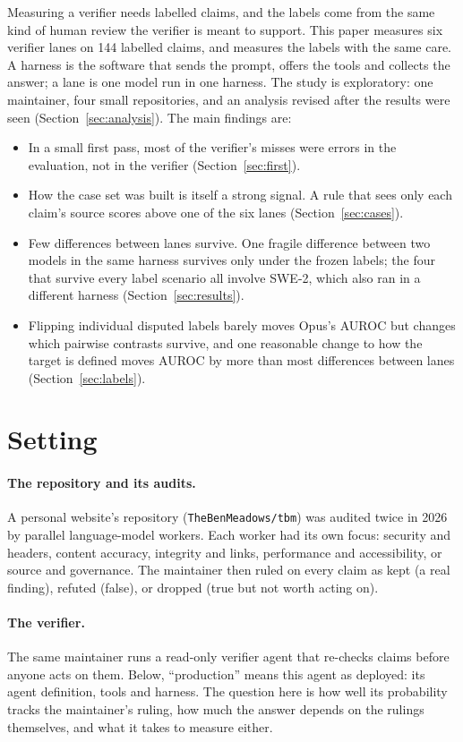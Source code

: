 \documentclass[11pt]{article}
\begin{document}
Measuring a verifier needs labelled claims, and the labels come from the same kind of human review the verifier is meant to support. This paper measures six verifier lanes on 144 labelled claims, and measures the labels with the same care. A harness is the software that sends the prompt, offers the tools and collects the answer; a lane is one model run in one harness. The study is exploratory: one maintainer, four small repositories, and an analysis revised after the results were seen (Section~\ref{sec:analysis}). The main findings are:

\begin{itemize}
  \item In a small first pass, most of the verifier's misses were errors in the evaluation, not in the verifier (Section~\ref{sec:first}).
  \item How the case set was built is itself a strong signal. A rule that sees only each claim's source scores above one of the six lanes (Section~\ref{sec:cases}).
  \item Few differences between lanes survive. One fragile difference between two models in the same harness survives only under the frozen labels; the four that survive every label scenario all involve SWE-2, which also ran in a different harness (Section~\ref{sec:results}).
  \item Flipping individual disputed labels barely moves Opus's AUROC but changes which pairwise contrasts survive, and one reasonable change to how the target is defined moves AUROC by more than most differences between lanes (Section~\ref{sec:labels}).
\end{itemize}

\section{Setting}

\paragraph{The repository and its audits.} A personal website's repository (\texttt{TheBenMeadows/tbm}) was audited twice in 2026 by parallel language-model workers. Each worker had its own focus: security and headers, content accuracy, integrity and links, performance and accessibility, or source and governance. The maintainer then ruled on every claim as kept (a real finding), refuted (false), or dropped (true but not worth acting on).

\paragraph{The verifier.} The same maintainer runs a read-only verifier agent that re-checks claims before anyone acts on them. Below, ``production'' means this agent as deployed: its agent definition, tools and harness. The question here is how well its probability tracks the maintainer's ruling, how much the answer depends on the rulings themselves, and what it takes to measure either.
\end{document}
